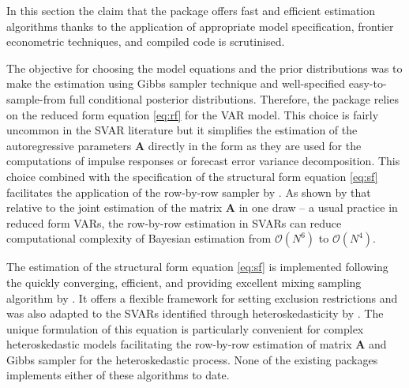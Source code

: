 \documentclass[
  nojss]{jss}
\begin{document}
In this section the claim that the  package offers fast and
efficient estimation algorithms thanks to the application of appropriate
model specification, frontier econometric techniques, and compiled code
is scrutinised.

The objective for choosing the model equations and the prior
distributions was to make the estimation using Gibbs sampler technique
\citep[see e.g.][]{CasellaGeorge1992} and well-specified
easy-to-sample-from full conditional posterior distributions. Therefore,
the package relies on the reduced form equation \eqref{eq:rf} for the
VAR model. This choice is fairly uncommon in the SVAR literature but it
simplifies the estimation of the autoregressive parameters
\(\mathbf{A}\) directly in the form as they are used for the
computations of impulse responses or forecast error variance
decomposition. This choice combined with the specification of the
structural form equation \eqref{eq:sf} facilitates the application of
the row-by-row sampler by \cite{chankoopyu2021}. As shown by
\cite{carriero_large_2019} that relative to the joint estimation of the
matrix \(\mathbf{A}\) in one draw -- a usual practice in reduced form
VARs, the row-by-row estimation in SVARs can reduce computational
complexity of Bayesian estimation from \(\mathcal{O}(N^6)\) to
\(\mathcal{O}(N^4)\).

The estimation of the structural form equation \eqref{eq:sf} is
implemented following the quickly converging, efficient, and providing
excellent mixing sampling algorithm by \cite{WaggonerZha2003}. It offers
a flexible framework for setting exclusion restrictions and was also
adapted to the SVARs identified through heteroskedasticity by
\cite{Wozniak2015}. The unique formulation of this equation is
particularly convenient for complex heteroskedastic models facilitating
the row-by-row estimation of matrix \(\mathbf{A}\) and Gibbs sampler for
the heteroskedastic process. None of the existing  packages
implements either of these algorithms to date.
\end{document}
